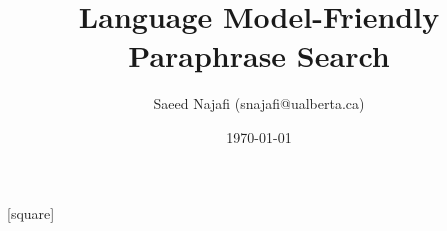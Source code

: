 \documentclass{beamer}
\title[]{Language Model-Friendly Paraphrase Search} %
\author{Saeed Najafi (snajafi@ualberta.ca)}
\institute[] %
{
}
\date{\today}
\begin{document}
[square]


\begin{frame}
\titlepage %
\end{frame}

\end{document}
